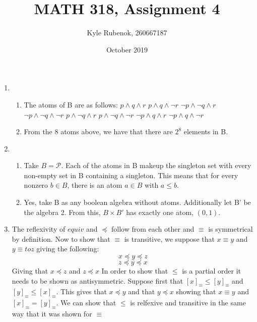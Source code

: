 \documentclass{article}
\title{MATH 318, Assignment 4}
\author{Kyle Rubenok, 260667187}
\date{October 2019}
\begin{document}
\maketitle

    \begin{enumerate}
        \item 
            \begin{enumerate}[label=\arabic*)] 
                \item The atoms of B are as follows: 
                    \newline 
                    $p \wedge q \wedge r$ \tab $p \wedge q \wedge \neg r$ \newline
                    $\neg p \wedge \neg q \wedge r$ \tab $\neg p \wedge \neg q \wedge \neg r$ \newline
                    $p \wedge \neg q \wedge r$ \tab $p \wedge \neg q \wedge \neg r$ \newline
                    $\neg p \wedge q \wedge r$ \tab $\neg p \wedge q \wedge \neg r$ \newline
                \item From the 8 atoms above, we have that there are $2^8$ elements in B. 
            \end{enumerate}
        \item
            \begin{enumerate}[label=\arabic*)]
                \item Take $B = \mathcal{P}$. Each of the atoms in B makeup the singleton set with every non-empty set in B containing a singleton. This means that for every nonzero $b \in B$, there is an atom $a \in B$ with $ a \leq b$. 
                \item Yes, take B as any boolean algebra without atoms. Additionally let B' be the algebra 2. From this, $B \times B'$ has exactly one atom, $(0,1)$.
            \end{enumerate}
        \item The reflexivity of $equiv$ and $\preceq$ follow from each other and $\equiv$ is symmetrical by definition.  Now to show that $\equiv$ is transitive, we suppose that $x\equiv y$ and $y \equiv to z$ giving the following:
        $$x \preceq y \preceq z$$
        $$z \preceq y \preceq x$$
        Giving that $x \preceq z$ and $z\preceq x$ In order to show that $ \leq $ is a partial order it needs to be shown as antisymmetric. Suppose first that $[x]_{\equiv} \leq [y]_{\equiv}$ and $[y]_{\equiv} \leq [x]_{\equiv}$. This gives that $x \preceq y$ and that $y \preceq x$ showing that $x \equiv y$ and $[x]_{\equiv} = [y]_{\equiv}$. We can show that $\leq$ is relfexive and transitive in the same way that it was shown for $\equiv$

\end{enumerate}
\end{document}
